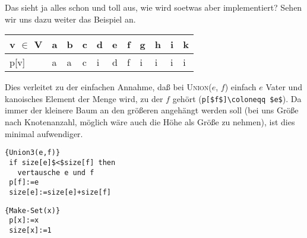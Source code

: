 \documentclass[ngerman,draft,parskip=half*,twoside]{scrreprt}
\theoremstyle{break}
\theoremstyle{nonumberbreak}
\begin{document}

Das sieht ja alles schon und toll aus, wie wird soetwas aber implementiert? Sehen wir uns dazu weiter das Beispiel an.

\begin{tabular}{l|llllllllll}
v $\in$ V & a & b & c & d & e & f & g & h & i & k\\
\hline
p[v] & a & a & c & i & d & f & i & i & i & i\\
\end{tabular}

Dies verleitet zu der einfachen Annahme, daß bei \textsc{Union}($e$, $f$) einfach $e$ Vater und kanoisches Element der
Menge wird, zu der $f$ gehört (\lstinline[mathescape=true]!p[$f$]\coloneqq $e$!). Da immer der kleinere Baum an den größeren
angehängt werden soll (bei uns Größe nach Knotenanzahl, möglich wäre auch die Höhe als Größe zu nehmen), ist
dies minimal aufwendiger.

\begin{Algorithmus}[H]
\begin{lstlisting}[frame=tlrb, mathescape=true, title=\textsc{Union\textnormal{(e, f)}},gobble=1]{Union3(e,f)}
 if size[e]$<$size[f] then
   vertausche e und f
 p[f]:=e
 size[e]:=size[e]+size[f]  
\end{lstlisting}
\end{Algorithmus} 

\begin{Algorithmus}[H]
\begin{lstlisting}[frame=tlrb, mathescape=true, title=\textsc{Make-Set\textnormal{(x)}},gobble=1]{Make-Set(x)}
 p[x]:=x
 size[x]:=1  
\end{lstlisting}
\end{Algorithmus} 
\end{document}
